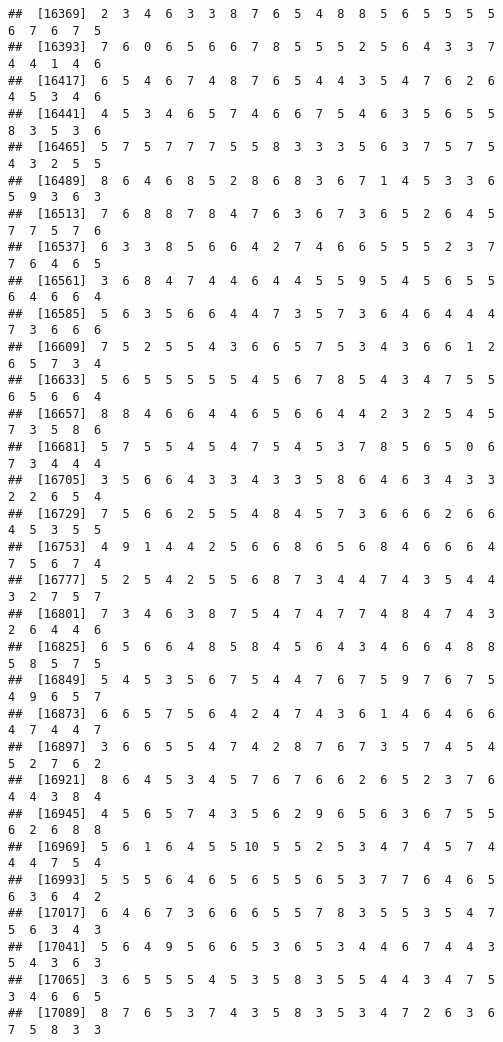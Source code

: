 \documentclass[
]{book}
\begin{document}
\begin{verbatim}
##  [16369]  2  3  4  6  3  3  8  7  6  5  4  8  8  5  6  5  5  5  5  6  7  6  7  5
##  [16393]  7  6  0  6  5  6  6  7  8  5  5  5  2  5  6  4  3  3  7  4  4  1  4  6
##  [16417]  6  5  4  6  7  4  8  7  6  5  4  4  3  5  4  7  6  2  6  4  5  3  4  6
##  [16441]  4  5  3  4  6  5  7  4  6  6  7  5  4  6  3  5  6  5  5  8  3  5  3  6
##  [16465]  5  7  5  7  7  7  5  5  8  3  3  3  5  6  3  7  5  7  5  4  3  2  5  5
##  [16489]  8  6  4  6  8  5  2  8  6  8  3  6  7  1  4  5  3  3  6  5  9  3  6  3
##  [16513]  7  6  8  8  7  8  4  7  6  3  6  7  3  6  5  2  6  4  5  7  7  5  7  6
##  [16537]  6  3  3  8  5  6  6  4  2  7  4  6  6  5  5  5  2  3  7  7  6  4  6  5
##  [16561]  3  6  8  4  7  4  4  6  4  4  5  5  9  5  4  5  6  5  5  6  4  6  6  4
##  [16585]  5  6  3  5  6  6  4  4  7  3  5  7  3  6  4  6  4  4  4  7  3  6  6  6
##  [16609]  7  5  2  5  5  4  3  6  6  5  7  5  3  4  3  6  6  1  2  6  5  7  3  4
##  [16633]  5  6  5  5  5  5  5  4  5  6  7  8  5  4  3  4  7  5  5  6  5  6  6  4
##  [16657]  8  8  4  6  6  4  4  6  5  6  6  4  4  2  3  2  5  4  5  7  3  5  8  6
##  [16681]  5  7  5  5  4  5  4  7  5  4  5  3  7  8  5  6  5  0  6  7  3  4  4  4
##  [16705]  3  5  6  6  4  3  3  4  3  3  5  8  6  4  6  3  4  3  3  2  2  6  5  4
##  [16729]  7  5  6  6  2  5  5  4  8  4  5  7  3  6  6  6  2  6  6  4  5  3  5  5
##  [16753]  4  9  1  4  4  2  5  6  6  8  6  5  6  8  4  6  6  6  4  7  5  6  7  4
##  [16777]  5  2  5  4  2  5  5  6  8  7  3  4  4  7  4  3  5  4  4  3  2  7  5  7
##  [16801]  7  3  4  6  3  8  7  5  4  7  4  7  7  4  8  4  7  4  3  2  6  4  4  6
##  [16825]  6  5  6  6  4  8  5  8  4  5  6  4  3  4  6  6  4  8  8  5  8  5  7  5
##  [16849]  5  4  5  3  5  6  7  5  4  4  7  6  7  5  9  7  6  7  5  4  9  6  5  7
##  [16873]  6  6  5  7  5  6  4  2  4  7  4  3  6  1  4  6  4  6  6  4  7  4  4  7
##  [16897]  3  6  6  5  5  4  7  4  2  8  7  6  7  3  5  7  4  5  4  5  2  7  6  2
##  [16921]  8  6  4  5  3  4  5  7  6  7  6  6  2  6  5  2  3  7  6  4  4  3  8  4
##  [16945]  4  5  6  5  7  4  3  5  6  2  9  6  5  6  3  6  7  5  5  6  2  6  8  8
##  [16969]  5  6  1  6  4  5  5 10  5  5  2  5  3  4  7  4  5  7  4  4  4  7  5  4
##  [16993]  5  5  5  6  4  6  5  6  5  5  6  5  3  7  7  6  4  6  5  6  3  6  4  2
##  [17017]  6  4  6  7  3  6  6  6  5  5  7  8  3  5  5  3  5  4  7  5  6  3  4  3
##  [17041]  5  6  4  9  5  6  6  5  3  6  5  3  4  4  6  7  4  4  3  5  4  3  6  3
##  [17065]  3  6  5  5  5  4  5  3  5  8  3  5  5  4  4  3  4  7  5  3  4  6  6  5
##  [17089]  8  7  6  5  3  7  4  3  5  8  3  5  3  4  7  2  6  3  6  7  5  8  3  3

\end{verbatim}
\end{document}
